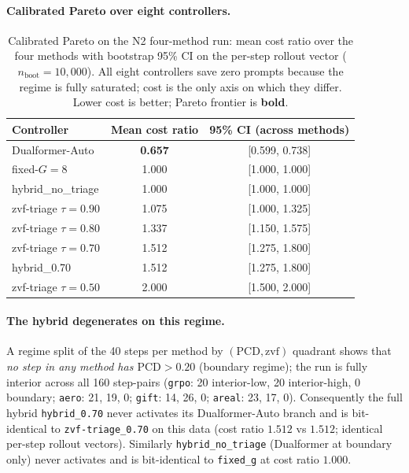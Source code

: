 \paragraph{Calibrated Pareto over eight controllers.}

\begin{table}[t]
\centering
\caption{Calibrated Pareto on the N2 four-method run: mean cost ratio
over the four methods with bootstrap 95\% CI on the per-step rollout
vector ($n_{\text{boot}}{=}10{,}000$). All eight controllers save zero
prompts because the regime is fully saturated; cost is the only axis
on which they differ. Lower cost is better; Pareto frontier is
\textbf{bold}.}
\label{tab:p7-pareto}
\begin{tabular}{lcc}
\toprule
Controller & Mean cost ratio & 95\% CI (across methods) \\
\midrule
Dualformer-Auto              & \textbf{0.657} & [0.599, 0.738] \\
fixed-$G{=}8$                & 1.000          & [1.000, 1.000] \\
hybrid\_no\_triage            & 1.000          & [1.000, 1.000] \\
zvf-triage $\tau{=}0.90$      & 1.075          & [1.000, 1.325] \\
zvf-triage $\tau{=}0.80$      & 1.337          & [1.150, 1.575] \\
zvf-triage $\tau{=}0.70$      & 1.512          & [1.275, 1.800] \\
hybrid\_0.70                  & 1.512          & [1.275, 1.800] \\
zvf-triage $\tau{=}0.50$      & 2.000          & [1.500, 2.000] \\
\bottomrule
\end{tabular}
\end{table}

\paragraph{The hybrid degenerates on this regime.}
A regime split of the 40 steps per method by
$(\mathrm{PCD}, \mathrm{zvf})$ quadrant shows that \emph{no step in
any method has $\mathrm{PCD} > 0.20$} (boundary regime); the run is
fully interior across all 160 step-pairs
(\texttt{grpo}: 20 interior-low, 20 interior-high, 0 boundary;
\texttt{aero}: 21, 19, 0; \texttt{gift}: 14, 26, 0;
\texttt{areal}: 23, 17, 0). Consequently the full hybrid
\texttt{hybrid\_0.70} never activates its Dualformer-Auto branch
and is bit-identical to \texttt{zvf-triage\_0.70} on this data
(cost ratio $1.512$ vs $1.512$; identical per-step rollout vectors).
Similarly \texttt{hybrid\_no\_triage} (Dualformer at boundary only)
never activates and is bit-identical to \texttt{fixed\_g} at
cost ratio $1.000$.


